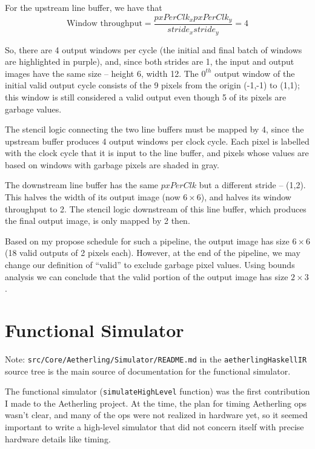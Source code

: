 \documentclass[12pt]{article}
\begin{document}
For the upstream line buffer, we have that
\begin{equation}
\text{Window throughput} =
\frac{pxPerClk_x pxPerClk_y}{stride_x stride_y} = 4
\end{equation}

So, there are 4 output windows per cycle (the initial and final batch
of windows are highlighted in purple), and, since both strides are 1,
the input and output images have the same size -- height 6, width
12. The $0^{th}$ output window of the initial valid output cycle
consists of the 9 pixels from the origin (-1,-1) to (1,1); this window
is still considered a valid output even though 5 of its pixels are
garbage values.

The stencil logic connecting the two line buffers must be mapped by 4,
since the upstream buffer produces 4 output windows per clock cycle.
Each pixel is labelled with the clock cycle that it is input to the
line buffer, and pixels whose values are based on windows with garbage
pixels are shaded in gray.

The downstream line buffer has the same $pxPerClk$ but a different
stride -- (1,2). This halves the width of its output image (now $6
\times 6$), and halves its window throughput to 2. The stencil logic
downstream of this line buffer, which produces the final output image,
is only mapped by 2 then.

Based on my propose schedule for such a pipeline, the output image
has size $6 \times 6$ (18 valid outputs of 2 pixels each). However,
at the end of the pipeline, we may change our definition of ``valid''
to exclude garbage pixel values. Using bounds analysis we can conclude
that the valid portion of the output image has size $2 \times 3$.

\section{Functional Simulator}

Note: \texttt{src/Core/Aetherling/Simulator/README.md} in the
\texttt{aetherlingHaskellIR} source tree is the main source of
documentation for the functional simulator.

The functional simulator (\texttt{simulateHighLevel} function) was the
first contribution I made to the Aetherling project. At the time, the
plan for timing Aetherling ops wasn't clear, and many of the ops were
not realized in hardware yet, so it seemed important to write a
high-level simulator that did not concern itself with precise hardware
details like timing.
\end{document}
